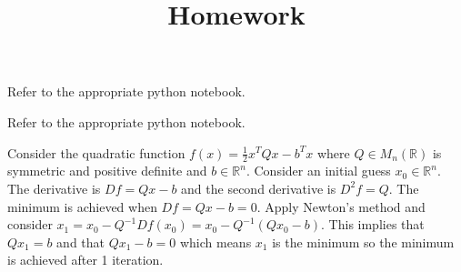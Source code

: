 \documentclass[12pt]{article}
\title{Homework}
\newcommand{\R}{\mathbb{R}}
\newenvironment{problem}[2][Problem]{\begin{trivlist}
\item[\hskip \labelsep {\bfseries #1}\hskip \labelsep {\bfseries #2}]}{\end{trivlist}}
\begin{document}
\begin{problem}{9.6.} 
Refer to the appropriate python notebook. 
\end{problem}


\begin{problem}{9.7.} 
Refer to the appropriate python notebook.
\end{problem}


\begin{problem}{9.10.} 
Consider the quadratic function $f(x) = \frac{1}{2}x^TQx - b^Tx$ where $Q \in M_n(\R)$ is symmetric and positive definite and $b \in \R^n$. Consider an initial guess $x_0 \in \R^n$. The derivative is $Df = Qx - b$ and the second derivative is $D^2f = Q$. The minimum is achieved when $Df = Qx - b = 0$. Apply Newton's method and consider $x_1 = x_0 - Q^{-1}Df(x_0) =  x_0  - Q^{-1}(Qx_0 - b)$. This implies that $Qx_1 = b$ and that $Qx_1 - b = 0$ which means $x_1$ is the minimum so the minimum is achieved after 1 iteration. 
\end{problem}
\end{document}
